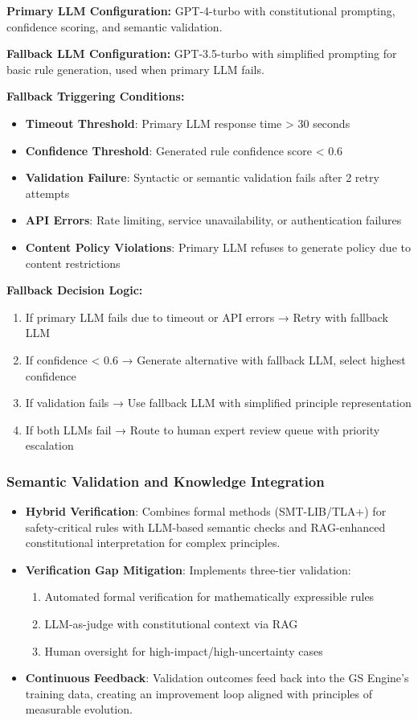 \documentclass[sigconf,natbib]{acmart}
\begin{document}
\textbf{Primary LLM Configuration:} GPT-4-turbo with constitutional prompting, confidence scoring, and semantic validation.

\textbf{Fallback LLM Configuration:} GPT-3.5-turbo with simplified prompting for basic rule generation, used when primary LLM fails.

\textbf{Fallback Triggering Conditions:}
\begin{itemize}
    \item \textbf{Timeout Threshold}: Primary LLM response time > 30 seconds
    \item \textbf{Confidence Threshold}: Generated rule confidence score < 0.6
    \item \textbf{Validation Failure}: Syntactic or semantic validation fails after 2 retry attempts
    \item \textbf{API Errors}: Rate limiting, service unavailability, or authentication failures
    \item \textbf{Content Policy Violations}: Primary LLM refuses to generate policy due to content restrictions
\end{itemize}

\textbf{Fallback Decision Logic:}
\begin{enumerate}
    \item If primary LLM fails due to timeout or API errors → Retry with fallback LLM
    \item If confidence < 0.6 → Generate alternative with fallback LLM, select highest confidence
    \item If validation fails → Use fallback LLM with simplified principle representation
    \item If both LLMs fail → Route to human expert review queue with priority escalation
\end{enumerate}

\subsubsection{Semantic Validation and Knowledge Integration}
\begin{itemize}
    \item \textbf{Hybrid Verification}: Combines formal methods (SMT-LIB/TLA+) for safety-critical rules with LLM-based semantic checks and RAG-enhanced constitutional interpretation for complex principles.
    \item \textbf{Verification Gap Mitigation}: Implements three-tier validation:
    \begin{enumerate}
        \item Automated formal verification for mathematically expressible rules
        \item LLM-as-judge with constitutional context via RAG
        \item Human oversight for high-impact/high-uncertainty cases
    \end{enumerate}
    \item \textbf{Continuous Feedback}: Validation outcomes feed back into the GS Engine's training data, creating an improvement loop aligned with principles of measurable evolution.
\end{itemize}
\end{document}
